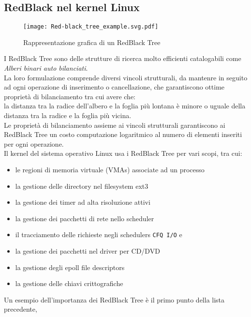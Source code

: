 \subsection{RedBlack nel kernel Linux}
\begin{figure}[H]
  \centering \texttt{[image: Red-black\_tree\_example.svg.pdf]}
  \caption{Rappresentazione grafica di un RedBlack Tree}
  \decoRule \label{fig:rbtree}
\end{figure}
I RedBlack Tree sono delle strutture di ricerca molto efficienti catalogabili come 
\emph{Alberi binari auto bilanciati}.\\%
La loro formulazione comprende diversi vincoli strutturali, da mantenre in seguito ad ogni operazione di inserimento o cancellazione,
che garantiscono ottime proprietà di bilanciamento tra cui avere che:\\ %
la distanza tra la radice dell'albero e la foglia più lontana è minore o uguale della distanza tra la radice e la foglia più vicina.\\
Le proprietà di bilanciamento assieme ai vincoli strutturali garantiscono ai RedBlack Tree
un costo computazione logaritmico al numero di elementi inseriti per ogni operazione.\\
\voidLine
Il kernel del sistema operativo Linux usa i RedBlack Tree per vari scopi, tra cui:
\begin{itemize}
	\item	le regioni di memoria virtuale (VMAs) associate ad un processo
	\item	la gestione delle directory nel filesystem ext3
	\item	la gestione dei timer ad alta risoluzione attivi
	\item	la gestione dei pacchetti di rete nello scheduler 
	\item	il tracciamento delle richieste negli schedulers \verb|CFQ I/O| e 
	\item	la gestione dei pacchetti nel driver per CD/DVD
	\item	la gestione degli epoll file descriptors
	\item	la gestione delle chiavi crittografiche
\end{itemize}  
{\bf \cite{lwnAgumentedRBtrees,lwnRBtrees}}
\voidLine
\label{chSpMMAux:memRegionRBTree}
Un esempio dell'importanza dei RedBlack Tree è il primo punto della lista precedente,
